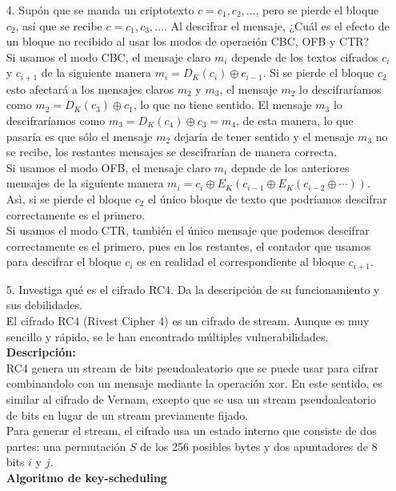 \documentclass[12pt]{article}
\begin{document}
\begin{enumerate}
    \item[4.] Supón que se manda un criptotexto $c=c_1,c_2, \ldots$, pero se pierde el bloque $c_2$, así que 
      se recibe $c=c_1, c_3, \ldots$. Al descifrar el mensaje, ¿Cuál es el efecto de un bloque no recibido al usar los modos 
      de operación CBC, OFB y CTR?\\
      Si usamos el modo CBC, el mensaje claro $m_i$ depende de los textos cifrados $c_i$ y $c_{i+1}$ de la siguiente manera 
      $m_i = D_K(c_{i})\oplus c_{i-1}$. Si se pierde el bloque $c_2$ esto afectará a los mensajes claros $m_2$ y $m_3$, el mensaje $m_2$ 
      lo descifraríamos como $m_2 = D_K(c_{3})\oplus c_{1}$, lo que no tiene sentido. El mensaje $m_3$ lo descifraríamos como $m_3 = D_K(c_{4})\oplus c_3 = m_4$, 
      de esta manera, lo que pasaría es que sólo el mensaje $m_2$ dejaría de tener sentido y el mensaje $m_3$ no se recibe, los restantes mensajes se descifrarían de manera correcta.\\
      Si usamos el modo OFB, el mensaje claro $m_i$ depnde de los anteriores mensajes de la siguiente manera 
      $m_i = c_i \oplus E_K(c_{i-1}\oplus E_K(c_{i-2}\oplus \cdots))$. Asì, si se pierde el bloque $c_2$ el único bloque de texto que podríamos descifrar correctamente es el primero.\\
      Si usamos el modo CTR, también el único mensaje que podemos descifrar correctamente es el primero, pues en los restantes, el contador que usamos para descifrar el 
      bloque $c_i$ es en realidad el correspondiente al bloque $c_{i+1}$.
    \item[5.] Investiga qué es el cifrado RC4. Da la descripción de su funcionamiento y sus debilidades.\\
      El cifrado RC4 (Rivest Cipher 4) es un cifrado de stream. Aunque es muy sencillo y rápido, se le han 
      encontrado múltiples vulnerabilidades.\\
      \textbf{Descripción:}\\
      RC4 genera un stream de bits pseudoaleatorio que se puede usar para cifrar combinandolo con un mensaje 
      mediante la operación xor. En este sentido, es similar al cifrado de Vernam, excepto que se usa un stream 
      pseudoaleatorio de bits en lugar de un stream previamente fijado.\\
      Para generar el stream, el cifrado usa un estado interno que consiste de dos partes: una permutación $S$
      de los 256 posibles bytes y dos apuntadores de 8 bits $i$ y $j$.\\
      \textbf{Algoritmo de key-scheduling}\\

\end{enumerate}
\end{document}
